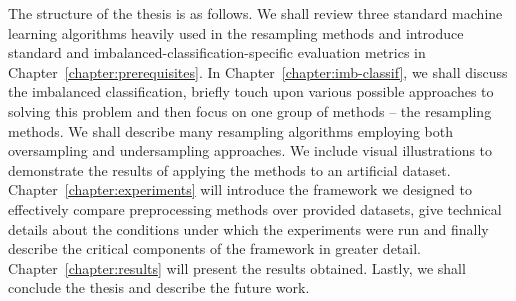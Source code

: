 The structure of the thesis is as follows. We shall review three standard machine learning
algorithms heavily used in the resampling methods and introduce standard and
imbalanced-classification-specific evaluation metrics in Chapter~\ref{chapter:prerequisites}. In
Chapter~\ref{chapter:imb-classif}, we shall discuss the imbalanced classification, briefly touch
upon various possible approaches to solving this problem and then focus on one group of methods –
the resampling methods. We shall describe many resampling algorithms employing both oversampling
and undersampling approaches. We include visual illustrations to demonstrate the results of
applying the methods to an artificial dataset. Chapter~\ref{chapter:experiments} will introduce the
framework we designed to effectively compare preprocessing methods over provided datasets, give
technical details about the conditions under which the experiments were run and finally describe
the critical components of the framework in greater detail. Chapter~\ref{chapter:results} will
present the results obtained. Lastly, we shall conclude the thesis and describe the future work.
